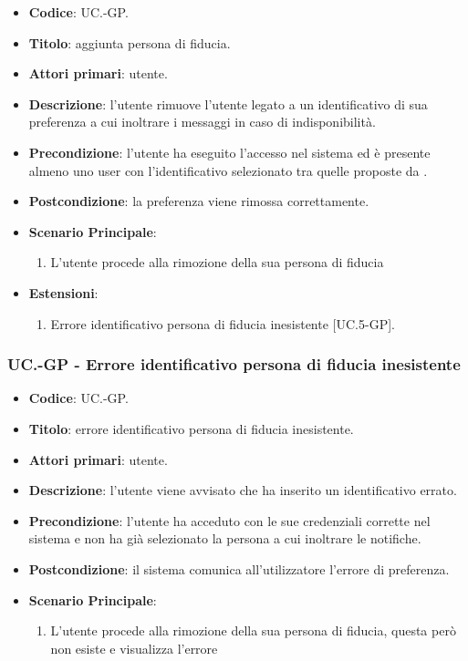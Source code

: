 	\begin{itemize}
		\item \textbf{Codice}: UC\theuccount.\thesubuccount-GP.
		\item \textbf{Titolo}: aggiunta persona di fiducia.
		\item \textbf{Attori primari}: utente.
		\item \textbf{Descrizione}:  l’utente rimuove l'utente legato a un identificativo di sua preferenza a cui inoltrare i messaggi in caso di indisponibilità.
		\item \textbf{Precondizione}: l’utente ha eseguito l'accesso nel sistema ed è presente almeno uno user con l'identificativo selezionato tra quelle proposte da \progetto.
		\item \textbf{Postcondizione}: la preferenza viene rimossa correttamente.
		\item \textbf{Scenario Principale}:
		\begin{enumerate}
			\item L'utente procede alla rimozione della sua persona di fiducia
		\end{enumerate}
		\item \textbf{Estensioni}:
		\begin{enumerate}
			\item Errore identificativo persona di fiducia inesistente [UC\theuccount.5-GP].
		\end{enumerate}
	\end{itemize}
	
	\subsubsection{UC\theuccount.\thesubuccount-GP - Errore identificativo persona di fiducia inesistente}
	
	\begin{itemize}
		\item \textbf{Codice}: UC\theuccount.\thesubuccount-GP.
		\item \textbf{Titolo}: errore identificativo persona di fiducia inesistente.
		\item \textbf{Attori primari}: utente.
		\item \textbf{Descrizione}: l’utente viene avvisato che ha inserito un identificativo errato.
		\item \textbf{Precondizione}: l’utente ha acceduto con le sue credenziali corrette nel sistema e non ha già selezionato la persona a cui inoltrare le notifiche.
		\item \textbf{Postcondizione}: il sistema comunica all’utilizzatore l’errore di preferenza.
		\item \textbf{Scenario Principale}:
		\begin{enumerate}
			\item L'utente procede alla rimozione della sua persona di fiducia, questa però non esiste e
			visualizza l'errore
		\end{enumerate}
	\end{itemize}


